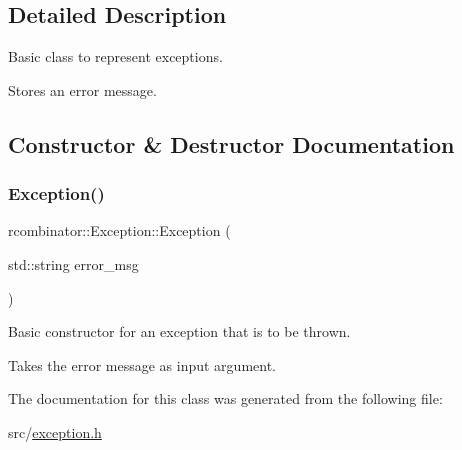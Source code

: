 \subsection{Detailed Description}
Basic class to represent exceptions. 

Stores an error message. 

\subsection{Constructor \& Destructor Documentation}
\mbox{\label{classrcombinator_1_1Exception_a7d3c8825d7c2d7d1d8c9c537725734de}} 
\subsubsection{\texorpdfstring{Exception()}{Exception()}}
{\footnotesize\ttfamily rcombinator\+::\+Exception\+::\+Exception (\begin{DoxyParamCaption}\item[{std\+::string}]{error\+\_\+msg }\end{DoxyParamCaption})\hspace{0.3cm}{\ttfamily [inline]}}



Basic constructor for an exception that is to be thrown. 

Takes the error message as input argument. 

The documentation for this class was generated from the following file\+:\begin{DoxyCompactItemize}
\item 
src/\mbox{\hyperlink{exception_8h}{exception.\+h}}\end{DoxyCompactItemize}
